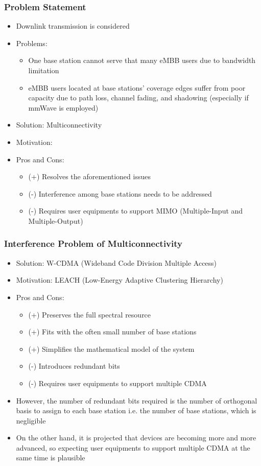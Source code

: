 \documentclass{beamer}
\begin{document}
\begin{frame}
  \frametitle{Problem Statement}
  \begin{itemize}
    \item Downlink transmission is considered
    \item Problems:
      \begin{itemize}
        \item One base station cannot serve that many eMBB users due to bandwidth limitation
        \item eMBB users located at base stations' coverage edges suffer from poor capacity due to path loss, channel fading, and shadowing (especially if mmWave is employed)
      \end{itemize}
    \item Solution: Multiconnectivity
    \item Motivation:
    \item Pros and Cons:
      \begin{itemize}
        \item (+) Resolves the aforementioned issues
        \item (-) Interference among base stations needs to be addressed
        \item (-) Requires user equipments to support MIMO (Multiple-Input and Multiple-Output)
      \end{itemize}
  \end{itemize}
\end{frame}

\begin{frame}
  \frametitle{Interference Problem of Multiconnectivity}
  \begin{itemize}
    \item Solution: W-CDMA (Wideband Code Division Multiple Access)
    \item Motivation: LEACH (Low-Energy Adaptive Clustering Hierarchy)
    \item Pros and Cons:
      \begin{itemize}
        \item (+) Preserves the full spectral resource
        \item (+) Fits with the often small number of base stations
        \item (+) Simplifies the mathematical model of the system
        \item (-) Introduces redundant bits
        \item (-) Requires user equipments to support multiple CDMA
      \end{itemize}
    \item However, the number of redundant bits required is the number of orthogonal basis to assign to each base station i.e. the number of base stations, which is negligible
    \item On the other hand, it is projected that devices are becoming more and more advanced, so expecting user equipments to support multiple CDMA at the same time is plausible
  \end{itemize}
\end{frame}
\end{document}
